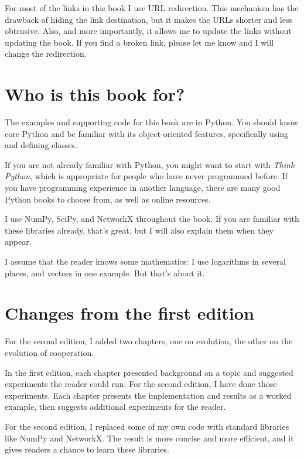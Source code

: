 \documentclass[12pt]{book}
\theoremstyle{exercise}
\begin{document}
For most of the links in this book I use URL redirection.  This mechanism has the drawback of hiding the link destination, but it makes the URLs shorter and less obtrusive.  Also, and more importantly, it allows me to update the links without updating the book.  If you find a broken link, please let me know and I will change the redirection.


\section{Who is this book for?}

The examples and supporting code for this book are in Python.  You
should know core Python and be familiar with its object-oriented features,
specifically using and defining classes.


If you are not already familiar with Python, you might want to start
with {\it Think Python}, which is appropriate for people who have never programmed before.  If you have programming experience in another language, there are many good Python books to choose from, as well as online resources.

I use NumPy, SciPy, and NetworkX throughout the book.  If you are familiar with these libraries already, that's great, but I will also explain them when they appear.


I assume that the reader knows some mathematics: I use logarithms in several places, and vectors in one example.  But that's about it.


\section{Changes from the first edition}

For the second edition, I added two chapters, one on evolution, the other on the evolution of cooperation.

In the first edition, each chapter presented background on a topic and suggested experiments the reader could run.  For the second edition, I have done those experiments.  Each chapter presents the implementation and results as a worked example, then suggests additional experiments for the reader.

For the second edition, I replaced some of my own code with standard libraries like NumPy and NetworkX.  The result is more concise and more efficient, and it gives readers a chance to learn these libraries.
\end{document}

